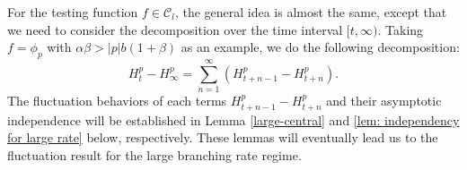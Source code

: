 \documentclass[12pt,a4paper]{amsart}
\theoremstyle{plain}
\theoremstyle{definition}
\numberwithin{equation}{section}
\begin{document}
    For the testing function $f\in \mathcal C_l$, the general idea is almost the same, except that we need to consider the decomposition over the time interval $[t,\infty)$. Taking $f = \phi_p$ with $\alpha \beta > |p|b(1+\beta)$ as an example, we do the following decomposition: 
\[
    H^p_t-H^p_\infty=\sum^{\infty}_{n=1}(H^p_{t+n-1}-H^p_{t+n}).
\]
    The fluctuation behaviors of each terms $H_{t+n-1}^p - H_{t+n}^p$ and their asymptotic independence will be established in Lemma \ref{large-central} and \ref{lem: independency for large rate} below, respectively.
    These lemmas will eventually lead us to the fluctuation result for the large branching rate regime.


\end{document}
